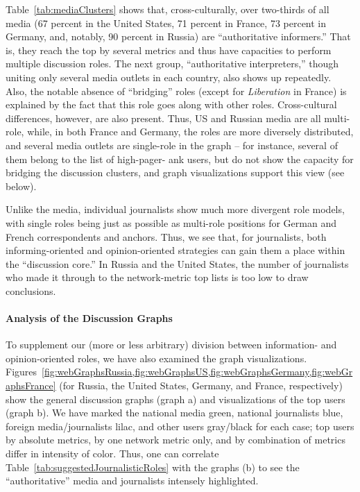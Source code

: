 Table~\cref{tab:mediaClusters} shows that, cross-culturally, over two-thirds of all media (67 percent in the United States, 71 percent in France, 73 percent in Germany, and, notably, 90 percent in Russia) are “authoritative informers.” That is, they reach the top by several metrics and thus have capacities to perform multiple discussion roles. The next group, “authoritative interpreters,” though uniting only several media outlets in each country, also shows up repeatedly. Also, the notable absence of “bridging” roles (except for \textit{Liberation} in France) is explained by the fact that this role goes along with other roles. Cross-cultural differences, however, are also present. Thus, US and Russian media are all multi-role, while, in both France and Germany, the roles are more diversely distributed, and several media outlets are single-role in the graph -- for instance, several of them belong to the list of high-pager- ank users, but do not show the capacity for bridging the discussion clusters, and graph visualizations support this view (see below).

Unlike the media, individual journalists show much more divergent role models, with single roles being just as possible as multi-role positions for German and French correspondents and anchors. Thus, we see that, for journalists, both informing-oriented and opinion-oriented strategies can gain them a place within the “discussion core.” In Russia and the United States, the number of journalists who made it through to the network-metric top lists is too low to draw conclusions.

\paragraph{Analysis of the Discussion Graphs}
To supplement our (more or less arbitrary) division between information- and opinion-oriented roles, we have also examined the graph visualizations. Figures~\cref{fig:webGraphsRussia,fig:webGraphsUS,fig:webGraphsGermany,fig:webGraphsFrance} (for Russia, the United States, Germany, and France, respectively) show the general discussion graphs (graph a) and visualizations of the top users (graph b). We have marked the national media green, national journalists blue, foreign media/journalists lilac, and other users gray/black for each case; top users by absolute metrics, by one network metric only, and by combination of metrics differ in intensity of color. Thus, one can correlate Table~\cref{tab:suggestedJournalisticRoles} with the graphs (b) to see the “authoritative” media and journalists intensely highlighted.

